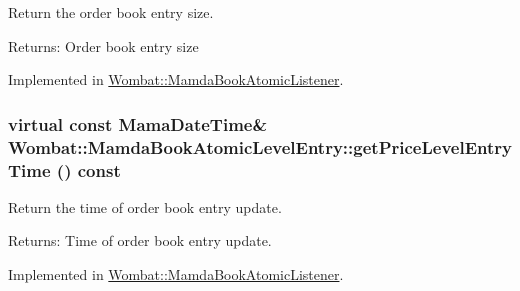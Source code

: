 Return the order book entry size. 

\begin{Desc}
\item[Returns:]Order book entry size \end{Desc}


Implemented in \hyperlink{classWombat_1_1MamdaBookAtomicListener_47bcfe27887db5dab390d398706f96fe}{Wombat::Mamda\-Book\-Atomic\-Listener}.\hypertarget{classWombat_1_1MamdaBookAtomicLevelEntry_dec1931e3377c2f62bfee4900e51ce8a}{
\subsubsection[getPriceLevelEntryTime]{\setlength{\rightskip}{0pt plus 5cm}virtual const Mama\-Date\-Time\& Wombat::Mamda\-Book\-Atomic\-Level\-Entry::get\-Price\-Level\-Entry\-Time () const}}
\label{classWombat_1_1MamdaBookAtomicLevelEntry_dec1931e3377c2f62bfee4900e51ce8a}


Return the time of order book entry update. 

\begin{Desc}
\item[Returns:]Time of order book entry update. \end{Desc}


Implemented in \hyperlink{classWombat_1_1MamdaBookAtomicListener_fa4686145cc28c1225b9e546399c4ff4}{Wombat::Mamda\-Book\-Atomic\-Listener}.